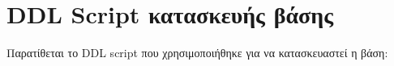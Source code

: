 \documentclass[a4paper]{article}
\begin{document}
\section{DDL Script κατασκευής βάσης}
Παρατίθεται το DDL script που χρησιμοποιήθηκε για να κατασκευαστεί η βάση:













\end{document}
